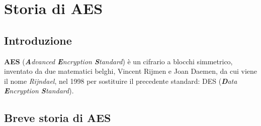 
\chapter{Storia di AES}





\section{Introduzione}


\textsf{\small \textbf{AES} (\emph{\textbf{A}dvanced \textbf{E}ncryption \textbf{S}tandard}) è un cifrario a blocchi simmetrico, inventato da due matematici belghi, Vincent Rijmen e Joan Daemen, da cui viene il nome \emph{Rijndael}, nel 1998 per sostituire il precedente standard: DES (\emph{\textbf{D}ata \textbf{E}ncryption \textbf{S}tandard}).}




\section{Breve storia di AES} 

